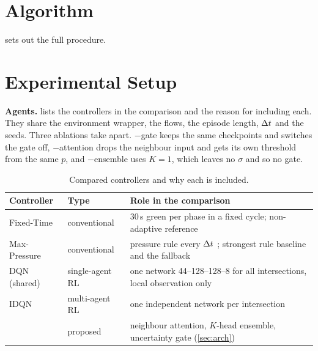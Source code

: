 \section{Algorithm}
\label{sec:algorithm}

 sets out the full procedure.



\section{Experimental Setup}
\label{sec:setup}

\textbf{Agents.}  lists the controllers in the comparison and the reason
for including each. They share the environment wrapper, the flows, the episode length, $\Delta t$
and the seeds. Three ablations take \ugmarl{} apart. $-$gate keeps the same checkpoints and
switches the gate off, $-$attention drops the neighbour input and gets its own threshold from
the same $p$, and $-$ensemble uses $K=1$, which leaves no $\sigma$ and so no gate.

\begin{table}[t]
\centering\small
\caption{Compared controllers and why each is included.}
\label{tab:agents}
\begin{tabular}{lll}
\toprule
Controller & Type & Role in the comparison \\
\midrule
Fixed-Time & conventional & 30\,s green per phase in a fixed cycle; non-adaptive reference \\
Max-Pressure & conventional & pressure rule every $\Delta t$ \citep{varaiya2013max}; strongest rule baseline and the fallback \\
DQN (shared) & single-agent RL & one network 44--128--128--8 for all intersections, local observation only \\
IDQN & multi-agent RL & one independent network per intersection \\
\ugmarl{} & proposed & neighbour attention, $K$-head ensemble, uncertainty gate (\cref{sec:arch}) \\
\bottomrule
\end{tabular}
\end{table}

